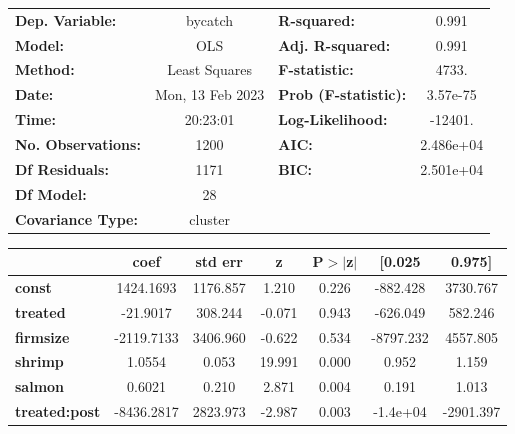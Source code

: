 \begin{center}
\begin{tabular}{lclc}
\toprule
\textbf{Dep. Variable:}    &     bycatch      & \textbf{  R-squared:         } &     0.991   \\
\textbf{Model:}            &       OLS        & \textbf{  Adj. R-squared:    } &     0.991   \\
\textbf{Method:}           &  Least Squares   & \textbf{  F-statistic:       } &     4733.   \\
\textbf{Date:}             & Mon, 13 Feb 2023 & \textbf{  Prob (F-statistic):} &  3.57e-75   \\
\textbf{Time:}             &     20:23:01     & \textbf{  Log-Likelihood:    } &   -12401.   \\
\textbf{No. Observations:} &        1200      & \textbf{  AIC:               } & 2.486e+04   \\
\textbf{Df Residuals:}     &        1171      & \textbf{  BIC:               } & 2.501e+04   \\
\textbf{Df Model:}         &          28      & \textbf{                     } &             \\
\textbf{Covariance Type:}  &     cluster      & \textbf{                     } &             \\
\bottomrule
\end{tabular}
\begin{tabular}{lcccccc}
                      & \textbf{coef} & \textbf{std err} & \textbf{z} & \textbf{P$> |$z$|$} & \textbf{[0.025} & \textbf{0.975]}  \\
\midrule
\textbf{const}        &    1424.1693  &     1176.857     &     1.210  &         0.226        &     -882.428    &     3730.767     \\
\textbf{treated}      &     -21.9017  &      308.244     &    -0.071  &         0.943        &     -626.049    &      582.246     \\
\textbf{firmsize}     &   -2119.7133  &     3406.960     &    -0.622  &         0.534        &    -8797.232    &     4557.805     \\
\textbf{shrimp}       &       1.0554  &        0.053     &    19.991  &         0.000        &        0.952    &        1.159     \\
\textbf{salmon}       &       0.6021  &        0.210     &     2.871  &         0.004        &        0.191    &        1.013     \\
\textbf{treated:post} &   -8436.2817  &     2823.973     &    -2.987  &         0.003        &     -1.4e+04    &    -2901.397     \\

\end{tabular}
\end{center}
